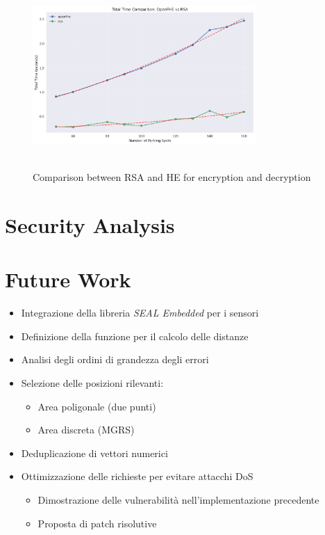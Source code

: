 \begin{figure}[h]
    \centering
    \includegraphics[width=8.5cm,height=7cm]{img/total_time_comparison.png}
    \caption{Comparison between RSA and HE for encryption and decryption}
    \label{fig:he-vs-rsa}
\end{figure}

\section{Security Analysis}

\section{Future Work}
\begin{itemize}
    \item Integrazione della libreria \emph{SEAL Embedded} per i sensori
    \item Definizione della funzione per il calcolo delle distanze
    \item Analisi degli ordini di grandezza degli errori
    \item Selezione delle posizioni rilevanti:
    \begin{itemize}
        \item Area poligonale (due punti)
        \item Area discreta (MGRS)
    \end{itemize}
    \item Deduplicazione di vettori numerici
    \item Ottimizzazione delle richieste per evitare attacchi DoS
    \begin{itemize}
        \item Dimostrazione delle vulnerabilità nell'implementazione precedente
        \item Proposta di patch risolutive
    \end{itemize}
\end{itemize}


